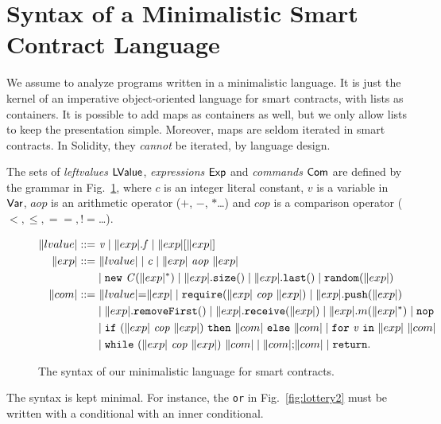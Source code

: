 \section{Syntax of a Minimalistic Smart Contract Language}\label{sec:syntax}

We assume to analyze programs written in a minimalistic language.
It is just the kernel of an imperative object-oriented language for
smart contracts, with lists as containers. It is possible to add maps
as containers as well, but we only allow lists to keep
the presentation simple. Moreover, maps are seldom iterated in smart
contracts. In Solidity, they \emph{cannot} be iterated, by language design.
%
\begin{definition}\label{def:exp_com}
  The sets of \emph{leftvalues} $\mathsf{LValue}$, \emph{expressions} $\mathsf{Exp}$ and
  \emph{commands} $\mathsf{Com}$ are defined by the grammar in Fig.~\ref{fig:syntax},
  where $c$ is an integer literal constant,
  $v$ is a variable in $\mathsf{Var}$, $\mathit{aop}$ is an arithmetic
  operator ($+$, $-$, $*$\ldots) and $\mathit{cop}$ is a comparison operator
  ($<,\le,==,!\!=$\ldots).
  \begin{figure}
  \begin{align*}
    \lvalue::=&\ \mathit{v}\mid\field{\exp}{f}\mid\listread{\exp}{\exp}\\
    \exp::=&\ \lvalue\mid\mathit{c}\mid\aop{\exp}{\exp}\\
    &\mid\new{C}{\exp^*}\mid\size{\exp}\mid\last{\exp}\mid\random{\exp}\\
    \com::=&\ \assign{\lvalue}{\exp}\mid\require{\exp}{\exp}\mid\push{\exp}{\exp}\\
    &\mid\removeFirst{\exp}\mid\receive{\exp}{\exp}\mid\call{\exp}{m}{\exp^*}\mid\nop\\
    &\mid\ife{\exp}{\exp}{\com}{\com}\mid\for{\mathit{v}}{\exp}{\com}\\
    & \mid\while{\exp}{\exp}{\com}\mid\sequence{\com}{\com}\mid\return.
  \end{align*}
  \caption{The syntax of our minimalistic language for smart contracts.}\label{fig:syntax}
  \end{figure}
\end{definition}
%
The syntax is kept minimal. For instance, the \texttt{or} in Fig.~\ref{fig:lottery2}
must be written with a conditional with an inner conditional.
%

